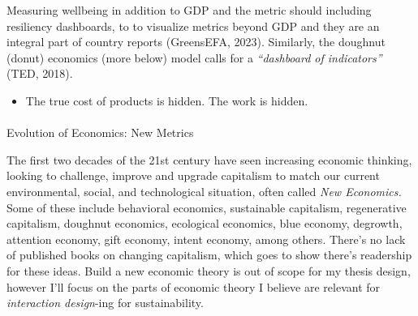 \documentclass[
  letterpaper,
  DIV=11,
  numbers=noendperiod]{scrartcl}
\makeatletter
\let\oldparagraph\paragraph
\renewcommand{\paragraph}{
    \@ifstar
      \xxxParagraphStar
      \xxxParagraphNoStar
  }
\newcommand{\xxxParagraphStar}[1]{\oldparagraph*{#1}\mbox{}}
\newcommand{\xxxParagraphNoStar}[1]{\oldparagraph{#1}\mbox{}}
\providecommand{\tightlist}{%
  \setlength{\itemsep}{0pt}\setlength{\parskip}{0pt}}\usepackage{longtable,booktabs,array}
\makeatother
\begin{document}
Measuring wellbeing in addition to GDP and the metric should including
resiliency dashboards, to to visualize metrics beyond GDP and they are
an integral part of country reports (GreensEFA, 2023). Similarly, the
doughnut (donut) economics (more below) model calls for a
\emph{``dashboard of indicators''} (TED, 2018).

\begin{itemize}
\tightlist
\item
  The true cost of products is hidden. The work is hidden.
\end{itemize}

\paragraph{Evolution of Economics: New
Metrics}\label{evolution-of-economics-new-metrics}

The first two decades of the 21st century have seen increasing economic
thinking, looking to challenge, improve and upgrade capitalism to match
our current environmental, social, and technological situation, often
called \emph{New Economics.} Some of these include behavioral economics,
sustainable capitalism, regenerative capitalism, doughnut economics,
ecological economics, blue economy, degrowth, attention economy, gift
economy, intent economy, among others. There's no lack of published
books on changing capitalism, which goes to show there's readership for
these ideas. Build a new economic theory is out of scope for my thesis
design, however I'll focus on the parts of economic theory I believe are
relevant for \emph{interaction design}-ing for sustainability.
\end{document}
